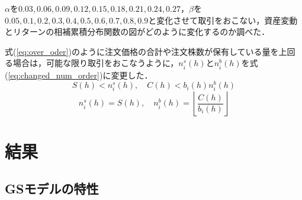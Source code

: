 \documentclass[titlepage]{jsreport}
\begin{document}
$\alpha$を$0.03, 0.06, 0.09, 0.12, 0.15, 0.18, 0.21, 0.24, 0.27$，$\beta$を$0.05, 0.1, 0.2, 0.3, 0.4, 0.5, 0.6, 0.7, 0.8, 0.9$と変化させて取引をおこない，資産変動とリターンの相補累積分布関数の図がどのように変化するのか調べた．

式(\ref{eq:over_oder})のように注文価格の合計や注文株数が保有している量を上回る場合は，可能な限り取引をおこなうように，$n_i^s(h)$と$n_i^b(h)$を式(\ref{eq:changed_num_order})に変更した．
\begin{equation}
    S(h) < n_i^s(h), \quad C(h) < b_i(h) n_i^b(h) \label{eq:over_oder}
\end{equation}
\begin{equation}
    n_i^s(h) = S(h), \quad n_i^b(h) = \left \lfloor \frac{C(h)}{b_i(h)} \right \rfloor \label{eq:changed_num_order}
\end{equation}




\chapter{結果} \label{chap:results}
\section{GSモデルの特性}\label{chap:result_GS}
\end{document}

